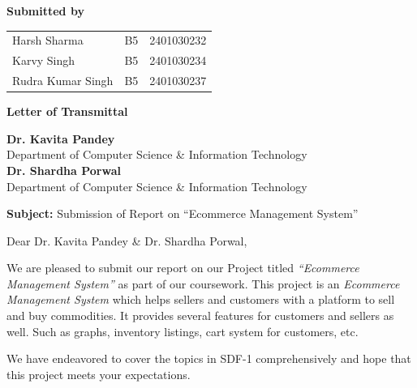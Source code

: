 \documentclass[12pt,a4paper]{article}
\begin{document}
\begin{titlepage}
    \textbf{Submitted by}
    \vspace{0.5cm}

    \begin{tabular}{lll}
        Harsh Sharma & B5 & 2401030232 \\
        Karvy Singh & B5 & 2401030234 \\
        Rudra Kumar Singh & B5 & 2401030237 \\
    \end{tabular}

    \vspace*{\fill}
    \normalsize
\end{titlepage}


\begin{center}
    \Large\textbf{Letter of Transmittal}
\end{center}
\vspace{1cm}

\noindent
\textbf{Dr. Kavita Pandey} \\
[0.5em]
Department of Computer Science \& Information Technology\\
[0.5em]
\textbf{Dr. Shardha Porwal} \\
[0.5em]
Department of Computer Science \& Information Technology\\
[0.5em]
\vspace{1cm}

\noindent
\textbf{Subject:} Submission of Report on ``Ecommerce Management System''

\vspace{1cm}

\noindent
Dear Dr. Kavita Pandey \& Dr. Shardha Porwal,

\vspace{1em}

\noindent
We are pleased to submit our report on our Project titled \textit{``Ecommerce Management System''} as part of our coursework. This project is an \textit{Ecommerce Management System} which helps sellers and customers with a platform to sell and buy commodities. It provides several features for customers and sellers as well. Such as graphs, inventory listings, cart system for customers, etc.

\vspace{1em}

\noindent
We have endeavored to cover the topics in SDF-1 comprehensively and hope that this project meets your expectations.
\end{document}
